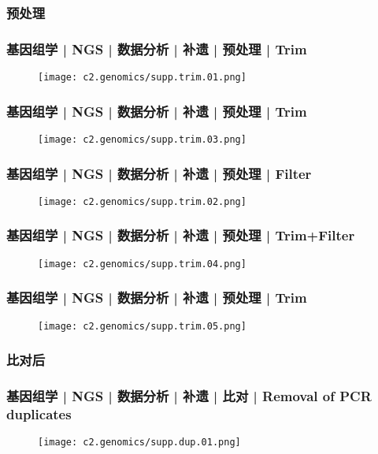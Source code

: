 \subsubsection{预处理}
\begin{frame}
  \frametitle{基因组学 | NGS | 数据分析 | 补遗 | 预处理 | Trim}
  \begin{figure}
    \centering
    \texttt{[image: c2.genomics/supp.trim.01.png]}
  \end{figure}
\end{frame}

\begin{frame}
  \frametitle{基因组学 | NGS | 数据分析 | 补遗 | 预处理 | Trim}
  \begin{figure}
    \centering
    \texttt{[image: c2.genomics/supp.trim.03.png]}
  \end{figure}
\end{frame}

\begin{frame}
  \frametitle{基因组学 | NGS | 数据分析 | 补遗 | 预处理 | Filter}
  \begin{figure}
    \centering
    \texttt{[image: c2.genomics/supp.trim.02.png]}
  \end{figure}
\end{frame}

\begin{frame}
  \frametitle{基因组学 | NGS | 数据分析 | 补遗 | 预处理 | Trim+Filter}
  \begin{figure}
    \centering
    \texttt{[image: c2.genomics/supp.trim.04.png]}
  \end{figure}
\end{frame}

\begin{frame}
  \frametitle{基因组学 | NGS | 数据分析 | 补遗 | 预处理 | Trim}
  \begin{figure}
    \centering
    \texttt{[image: c2.genomics/supp.trim.05.png]}
  \end{figure}
\end{frame}

\subsubsection{比对后}
\begin{frame}
  \frametitle{基因组学 | NGS | 数据分析 | 补遗 | 比对 | Removal of PCR duplicates}
  \begin{figure}
    \centering
    \texttt{[image: c2.genomics/supp.dup.01.png]}
  \end{figure}
\end{frame}

